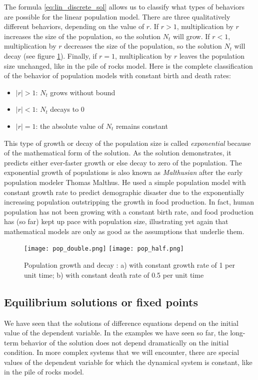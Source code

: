 \documentclass[11pt]{book}
\begin{document}
The formula \ref{eq:lin_discrete_sol} allows us to classify what types of behaviors are possible for the linear population model. There are three qualitatively different behaviors, depending on the value of $r$. If $r > 1$, multiplication by $r$ increases the size of the population, so the solution $N_t$ will grow. If $r < 1$, multiplication by $r$ decreases the size of the population, so the solution $N_t$ will decay (see figure \ref{fig:exp_growth}). Finally, if $r=1$, multiplication by $r$ leaves the population size unchanged, like in the pile of rocks model. Here is the complete classification of the behavior of population models with constant birth and death rates:
\begin{itemize}
\item $|r| > 1$: $N_t$ grows without bound
\item $|r| < 1$: $N_t$ decays to 0
\item $|r| = 1 $: the absolute value  of $N_t$ remains constant
\end{itemize}
This type of growth or decay of the population size is called \emph{exponential} because of the mathematical form of the solution. As the solution demonstrates, it predicts either ever-faster growth or else decay to zero of the population. The exponential growth of populations is also known as \emph{Malthusian} after the early population modeler Thomas Malthus. He used a simple population model with constant growth rate to predict demographic disaster due to the exponentially increasing population outstripping the growth in food production. In fact, human population has not been growing with a constant birth rate, and food production has (so far) kept up pace with population size, illustrating yet again that mathematical models are only as good as the assumptions that underlie them.

\begin{figure}[htbp] %
   \centering
   \texttt{[image: pop\_double.png]}
   \texttt{[image: pop\_half.png]}
   \caption{Population growth and decay : a) with constant growth rate of 1 per unit time; b) with constant death rate of 0.5 per unit time}
   \label{fig:exp_growth}
\end{figure}

\subsection{Equilibrium solutions or fixed points}
We have seen that the solutions of difference equations depend on the initial value of the dependent variable. In the examples we have seen so far, the long-term behavior of the solution does not depend dramatically on the initial condition. In more complex systems that we will encounter, there are special values of the dependent variable for which the dynamical system is constant, like in the pile of rocks model.
\end{document}
